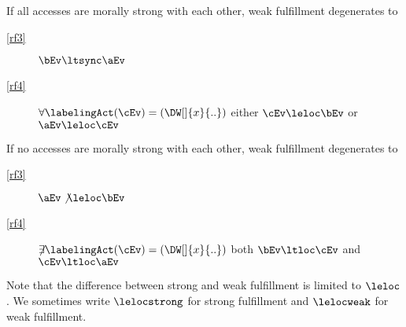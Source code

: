 If all accesses are morally strong with each other, weak fulfillment
degenerates to
\begin{description}
\item[\eqref{rf3}]
  $\bEv \ltsync \aEv$
\item[\eqref{rf4}]
  $\forall\labelingAct(\cEv)=(\DW[]{x}{..})$ either
  $\cEv \leloc \bEv$ or $\aEv \leloc \cEv$
\end{description}

If no accesses are morally strong with each other, weak fulfillment
degenerates to
\begin{description}
\item[\eqref{rf3}]
  $\aEv \not\leloc \bEv$
\item[\eqref{rf4}]
  $\not\mkern-5mu\exists\labelingAct(\cEv)=(\DW[]{x}{..})$ 
  both $\bEv \ltloc \cEv$ and $\cEv \ltloc \aEv$
\end{description}

Note that the difference between strong and weak fulfillment is limited to $\leloc$.
We sometimes write $\lelocstrong$ for strong fulfillment and
$\lelocweak$ for weak fulfillment.


